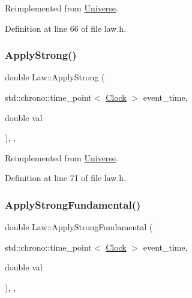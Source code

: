 Reimplemented from \mbox{\hyperlink{class_universe_a76c0b5e63c2a7d1988c44db341c3d64c}{Universe}}.



Definition at line 66 of file law.\+h.

\mbox{\label{class_law_ab38659b209055df7e59f4bcd1b9e545a}} 
\subsubsection{\texorpdfstring{Apply\+Strong()}{ApplyStrong()}}
{\footnotesize\ttfamily double Law\+::\+Apply\+Strong (\begin{DoxyParamCaption}\item[{std\+::chrono\+::time\+\_\+point$<$ \mbox{\hyperlink{universe_8h_a0ef8d951d1ca5ab3cfaf7ab4c7a6fd80}{Clock}} $>$}]{event\+\_\+time,  }\item[{double}]{val }\end{DoxyParamCaption})\hspace{0.3cm}{\ttfamily [inline]}, {\ttfamily [final]}, {\ttfamily [virtual]}}



Reimplemented from \mbox{\hyperlink{class_universe_a906a88b37f10bfa630bef49dfd0e907a}{Universe}}.



Definition at line 71 of file law.\+h.

\mbox{\label{class_law_a57d05f26e1c0ee953260ebd3780248f8}} 
\subsubsection{\texorpdfstring{Apply\+Strong\+Fundamental()}{ApplyStrongFundamental()}}
{\footnotesize\ttfamily double Law\+::\+Apply\+Strong\+Fundamental (\begin{DoxyParamCaption}\item[{std\+::chrono\+::time\+\_\+point$<$ \mbox{\hyperlink{universe_8h_a0ef8d951d1ca5ab3cfaf7ab4c7a6fd80}{Clock}} $>$}]{event\+\_\+time,  }\item[{double}]{val }\end{DoxyParamCaption})\hspace{0.3cm}{\ttfamily [inline]}, {\ttfamily [final]}, {\ttfamily [virtual]}}



